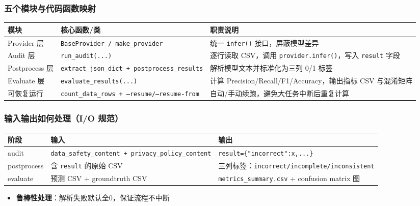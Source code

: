 \documentclass[AutoFakeBold,AutoFakeSlant]{beamer}
\begin{document}
\begin{frame}
    \frametitle{五个模块与代码函数映射}
    \scriptsize
    \begin{tabularx}{\textwidth}{|p{1.9cm}|p{3.1cm}|X|}
        \toprule
        \textbf{模块} & \textbf{核心函数/类} & \textbf{职责说明} \\
        \midrule
        Provider 层 & \texttt{BaseProvider / make\_provider} & 统一 \texttt{infer()} 接口，屏蔽模型差异 \\
        \midrule
        Audit 层 & \texttt{run\_audit(...)} & 逐行读取 CSV，调用 \texttt{provider.infer()}，写入 \texttt{result} 字段 \\
        \midrule
        Postprocess 层 & \texttt{extract\_json\_dict + postprocess\_results} & 解析模型文本并标准化为三列 0/1 标签 \\
        \midrule
        Evaluate 层 & \texttt{evaluate\_results(...)} & 计算 Precision/Recall/F1/Accuracy，输出指标 CSV 与混淆矩阵 \\
        \midrule
        可恢复运行 & \texttt{count\_data\_rows + --resume/--resume-from} & 自动/手动续跑，避免大任务中断后重复计算 \\
        \bottomrule
    \end{tabularx}
\end{frame}

\begin{frame}
    \frametitle{输入输出如何处理（I/O 规范）}
    \scriptsize
    \begin{tabularx}{\textwidth}{|p{1.5cm}|p{4cm}|p{5cm}|}
        \toprule
        \textbf{阶段} & \textbf{输入} & \textbf{输出} \\
        \midrule
        audit & \texttt{data\_safety\_content + privacy\_policy\_content} & \texttt{result=\{"incorrect":x,...\}} \\
        \midrule
        postprocess & 含 \texttt{result} 的原始 CSV & 三列标签：\texttt{incorrect/incomplete/inconsistent} \\
        \midrule
        evaluate & 预测 CSV + groundtruth CSV & \texttt{metrics\_summary.csv} + confusion matrix 图 \\
        \bottomrule
    \end{tabularx}
    \vspace{0.4em}
    \begin{itemize}
        \item \textbf{鲁棒性处理}：解析失败默认全0，保证流程不中断
    \end{itemize}
\end{frame}
\end{document}
